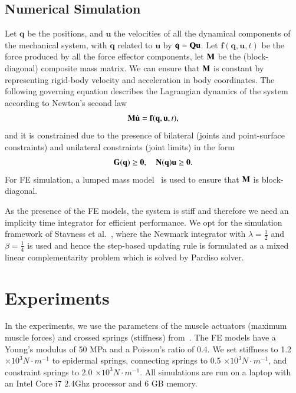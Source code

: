 \subsection{Numerical Simulation}
\label{sec:numberical}
Let $\mathbf{q}$ be the positions, and $\mathbf{u}$ the velocities of all the dynamical components of the mechanical system, with $\dot{\mathbf{q}}$ related to $\mathbf{u}$ by $\dot{\mathbf{q}} = \mbox{\textbf{Q}}\mathbf{u}$. Let $\mathbf{f}(\mathbf{q}, \mathbf{u}, t)$ be the force produced by all the force effector components,
let $\mbox{\textbf{M}}$ be the (block-diagonal) composite mass matrix. We can ensure that $\mbox{\textbf{M}}$ is constant by representing rigid-body velocity and acceleration in body coordinates. The following governing equation describes the Lagrangian dynamics of the system according to Newton's second law
\begin{equation}
\mbox{\textbf{M}}\mathbf{\dot{u}=f(q,u}, t),
\end{equation}
and it is constrained due to the presence of bilateral (joints and point-surface constraints) and unilateral
constraints (joint limits) in the form
\begin{equation}
\mbox{\textbf{G}}(\mathbf{q})\geq \mathbf{0}, \quad \mbox{\textbf{N}}(\mathbf{q)u} \geq \mathbf{0}.
\end{equation}
For FE simulation, a lumped mass model~\cite{Stavness:2011:CNM} is used to ensure that $\mbox{\textbf{M}}$ is block-diagonal.

As the presence of the FE models, the system is stiff and therefore we need an implicity time integrator for efficient performance. We opt for the simulation framework of Stavness et al.~\cite{Stavness:2011:CNM},
where the Newmark integrator with $\lambda=\frac{1}{2}$ and $\beta=\frac{1}{4}$ is used and hence the step-based updating rule is formulated as a mixed linear complementarity problem which is solved by Pardiso solver\cite{Schenk:2004:solving}.

\section{Experiments}
\label{sec:experiments}
In the experiments, we use the parameters of the muscle actuators (maximum muscle forces) and crossed springs (stiffness) from~\cite{Stavness:2011:CNM}. The FE models have a Young's modulus of 50 MPa and a Poisson's ratio of 0.4. We set stiffness to 1.2$\times 10^{3}N\cdot m^{-1}$ to epidermal springs, connecting springs to 0.5 $\times10^{3}N\cdot m^{-1}$, and constraint springs to 2.0 $\times10^{3}N\cdot m^{-1}$. All simulations are run on a laptop with an Intel Core i7 2.4Ghz processor and 6 GB memory.

